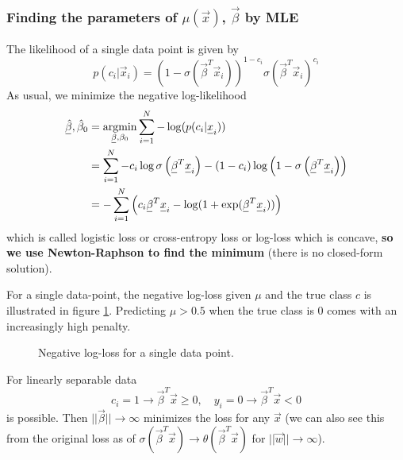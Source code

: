 \subsubsection{Finding the parameters of $\mu(\vec{x})$, $\vec{\beta}$ by MLE}
The likelihood of a single data point is given by
\begin{equation}
    p(c_i | \vec{x}_i) = (1 - \sigma(\vec{\beta}^T \vec{x}_i))^{1 - c_i} \sigma(\vec{\beta}^T \vec{x}_i)^{c_i}
\end{equation}
As usual, we minimize the negative log-likelihood
\begin{equation}
    \begin{aligned}
        \vec{\hat{\beta}}, \hat{\beta}_0 &= \argmin_{\vec{\beta}, \beta_0} \sum_{i=1}^N -\log(p(c_i | \vec{x}_i)) \\
        &=\sum_{i=1}^N-c_i \log \sigma\left(\vec{\beta}^T \vec{x}_i\right)-\left(1-c_i\right) \log \left(1-\sigma\left(\vec{\beta}^T \vec{x}_i\right)\right) \\
        &=-\sum_{i=1}^N \left( c_i \vec{\beta}^T \vec{x}_i - \log(1 + \exp(\vec{\beta}^T \vec{x}_i)) \right)
    \end{aligned}
\end{equation}
which is called \textcolor{blue1}{logistic loss} or \textcolor{blue1}{cross-entropy loss} or 
\textcolor{blue1}{log-loss} which is concave, \textbf{so we use Newton-Raphson to find the minimum}
(there is no closed-form solution).

For a single data-point, the negative log-loss given $\mu$
and the true class $c$ is illustrated in figure \ref{fig:log_loss}.
Predicting $\mu > 0.5$ when the true class is $0$ comes
with an increasingly high penalty.

\begin{figure}[!htb]
    \centering
    
    \caption{Negative log-loss for a single data point.}
    \label{fig:log_loss}
\end{figure}

For linearly separable data
\begin{equation}
    c_i = 1 \rightarrow \vec{\beta}^T \vec{x} \geq 0, \quad y_i = 0 \rightarrow \vec{\beta}^T \vec{x} < 0
\end{equation}
is possible. Then $||\vec{\beta}|| \rightarrow \infty$ minimizes the
loss for any $\vec{x}$ (we can also see this from the original
loss as of $\sigma(\vec{\beta}^T \vec{x}) \rightarrow \theta(\vec{\beta}^T \vec{x})$ for $||\vec{w}|| \rightarrow \infty$).


